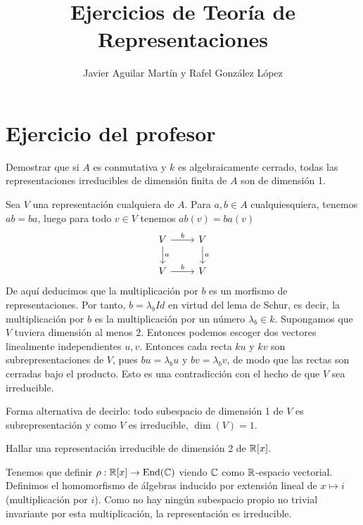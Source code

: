 \documentclass[twoside]{article}
\begin{document}
\title{Ejercicios de Teoría de Representaciones}
\author{Javier Aguilar Martín y Rafel González López}
\maketitle

\section{Ejercicio del profesor}


\begin{ejercicio}{1}
Demostrar que si $A$ es conmutativa y $k$ es algebraicamente cerrado, todas las representaciones irreducibles de dimensión finita de $A$ son de dimensión 1. 
\end{ejercicio}
\begin{solucion}
Sea $V$ una representación cualquiera de $A$. Para $a,b\in A$ cualquiesquiera, tenemos $ab=ba$, luego para todo $v\in V$ tenemos $ab(v)=ba(v)$
\[
\begin{tikzcd}
V\arrow[r, "b"] \arrow[d, "a"] & V\arrow[d, "a"]\\
V\arrow[r, "b"] & V
\end{tikzcd}
\]
De aquí deducimos que la multiplicación por $b$ es un morfismo de representaciones. Por tanto, $b=\lambda_b Id$ en virtud del lema de Schur, es decir, la multiplicación por $b$ es la multiplicación por un número $\lambda_b\in k$. Supongamos que $V$ tuviera dimensión al menos 2. Entonces podemos escoger dos vectores linealmente independientes $u,v$. Entonces cada recta $ku$ y $kv$ son subrepresentaciones de $V$, pues $bu=\lambda_bu$ y $bv=\lambda_bv$, de modo que las rectas son cerradas bajo el producto. Esto es una contradicción con el hecho de que $V$ sea irreducible. 

Forma alternativa de decirlo: todo subespacio de dimensión 1 de $V$ es subrepresentación y como $V$ es irreducible, $\dim(V)=1$. 

\end{solucion}

\newpage

\begin{ejercicio}{2}
Hallar una representación irreducible de dimensión 2 de $\mathbb{R}[x]$. 
\end{ejercicio}
\begin{solucion}
Tenemos que definir $\rho:\mathbb{R}[x]\to \operatorname{End}(\mathbb{C})$ viendo $\mathbb{C}$ como $\mathbb{R}$-espacio vectorial. Definimos el homomorfismo de álgebras inducido por extensión lineal de $x\mapsto i$ (multiplicación por $i$). Como no hay ningún subespacio propio no trivial invariante por esta multiplicación, la representación es irreducible.  
\end{solucion}
\end{document}
